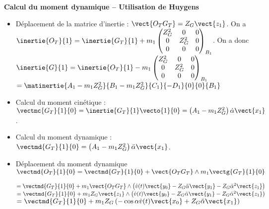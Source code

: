 \begin{multicols}{2}
\begin{corrige}
\begin{itemize}
\end{itemize}
%
%
%
%



\textbf{Calcul du moment dynamique -- Utilisation de Huygens} 
\begin{itemize}
\item Déplacement de la matrice d'inertie : $\vect{O_T G_T}=Z_G\vect{z_1}$. On a $\inertie{O_T}{1}=\inertie{G_T}{1}+m_1\begin{pmatrix}
Z_G^2 & 0 & 0 \\
0          & Z_G^2 & 0 \\
0 & 0 & 0 \\
\end{pmatrix}_{B_1}$. On a donc 
$\inertie{G}{1}
=\inertie{O_T}{1}-m_1\begin{pmatrix}
Z_G^2 & 0 & 0 \\
0          & Z_G^2 & 0 \\
0 & 0 & 0 \\
\end{pmatrix}_{B_1}
$  $ =\matinertie{A_1-m_1Z_G^2}{B_1-m_1Z_G^2}{C_1}{-D_1}{0}{0}{B_1}$
\item Calcul du moment cinétique : $\vectmc{G_T}{1}{0} = \inertie{G_T}{1} \vecto{1}{0}= \left( A_1-m_1Z_G^2 \right) \dot{\alpha} \vect{x_1}$.
\item Calcul du moment dynamique : $\vectmd{G_T}{1}{0} = \left( A_1-m_1Z_G^2 \right) \ddot{\alpha} \vect{x_1}$.
\item Déplacement du moment dynamique $\vectmd{O_T}{1}{0}=\vectmd{G_T}{1}{0}+ \vect{O_T G_T} \wedge  m_1\vectg{G_T}{1}{0} $ 

$=\vectmd{G_T}{1}{0}+m_1 \vect{O_T G_T} \wedge   \left(\dot{v}(t)\vect{y_0} - Z_G \ddot{\alpha}\vect{y_1} -Z_G \dot{\alpha}^2\vect{z_1} \right) $
$=\vectmd{G_T}{1}{0}+m_1 Z_G \vect{z_1} \wedge   \left(\dot{v}(t)\vect{y_0} - Z_G \ddot{\alpha}\vect{y_1} -Z_G \dot{\alpha}^2\vect{z_1} \right) $
$=\vectmd{G_T}{1}{0}+m_1 Z_G    \left(-\cos\alpha \dot{v}(t) \vect{x_0} + Z_G \ddot{\alpha}\vect{x_1}   \right) $


\end{itemize}
\end{corrige}
\end{multicols}
